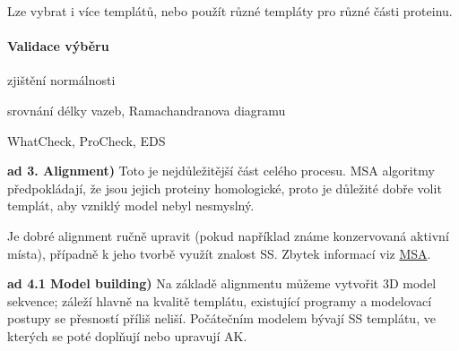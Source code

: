 \documentclass[DIV=8]{scrreprt}
\begin{document}
Lze vybrat i více templátů, nebo použít různé templáty pro různé části proteinu.

\paragraph{Validace výběru}
\begin{myItemize}[nosep]
    \item zjištění normálnosti
    \item srovnání délky vazeb, Ramachandranova diagramu
    \item WhatCheck, ProCheck, EDS
\end{myItemize}



\textbf{ad 3. Alignment)} Toto je nejdůležitější část celého procesu. MSA algoritmy předpokládají, že jsou jejich proteiny homologické, proto je důležité dobře volit templát, aby vzniklý model nebyl nesmyslný.

Je dobré alignment ručně upravit (pokud například známe konzervovaná aktivní místa), případně k jeho tvorbě využít znalost SS. Zbytek informací viz \hyperref[Multiple sequence alignment]{MSA}.

\textbf{ad 4.1 Model building)} Na základě alignmentu můžeme vytvořit 3D model sekvence; záleží hlavně na kvalitě templátu, existující programy a modelovací postupy se přesností příliš neliší. Počátečním modelem bývají SS templátu, ve kterých se poté doplňují nebo upravují AK.
\end{document}
